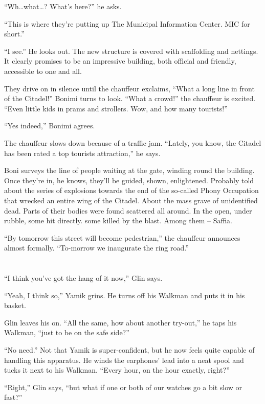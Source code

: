 \documentclass[twoside,11pt]{book}
\begin{document}
``Wh{\ldots}what{\dots}? What's here?'' he asks.

``This is where they're putting up The Municipal Information Center. MIC for short.''

``I see.'' He looks out. The new structure is covered with scaffolding and nettings.
It clearly promises to be an impressive building, both official and friendly, accessible to one and
all.

They drive on in silence until the chauffeur exclaims, ``What a long line in front of the
Citadel!'' Bonimi turns to look. ``What a crowd!'' the chauffeur is excited.
``Even little kids in prams and strollers. Wow, and how many tourists!''

``Yes indeed,'' Bonimi agrees.

The chauffeur slows down because of a traffic jam. ``Lately, you know, the Citadel has been rated a top
tourists attraction,'' he says.

Boni surveys the line of people waiting at the gate, winding round the building. Once they're in, he knows, they'll be
guided, shown, enlightened. Probably told about the series of explosions towards the end of the so-called Phony
Occupation that wrecked an entire wing of the Citadel. About the mass grave of unidentified dead. Parts of their
bodies were found scattered all around. In the open, under rubble, some hit directly. some killed by the blast. Among
them -- Saffia.

``By tomorrow this street will become pedestrian,'' the chauffeur announces almost formally.
``To-morrow we inaugurate the ring road.''


\bigskip

\chapter{}

``I think you've got the hang of it now,'' Glin says.

``Yeah, I think so,'' Yamik grins. He turns off his Walkman and puts it in his basket.

Glin leaves his on. ``All the same, how about another try-out,'' he taps his Walkman, ``just
to be on the safe side?''

``No need.'' Not that Yamik is super-confident, but he now feels quite capable of handling
this apparatus. He winds the earphones' lead into a neat spool and tucks it next to his Walkman. ``Every
hour, on the hour exactly, right?'' \

``Right,'' Glin says, ``but what if one or both of our watches go a bit slow or
fast?''
\end{document}
